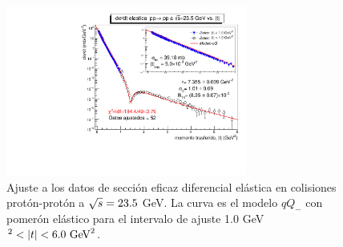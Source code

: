 \begin{figure}[H]\centering
\includegraphics[width=7.9cm]{graficas/ajuste23pp.pdf}
\caption{\mismall Ajuste a los datos de sección eficaz diferencial elástica en colisiones prot\'on-prot\'on a $\sqrt{s}=23\textup{.}5$ GeV. La curva es el modelo $qQ_{-}$ con pomer\'on elástico para el intervalo de ajuste 1.0 GeV$^2<|t|<\textup{6.0 GeV}^2$.}
\label{lafig_7}
\end{figure}%
